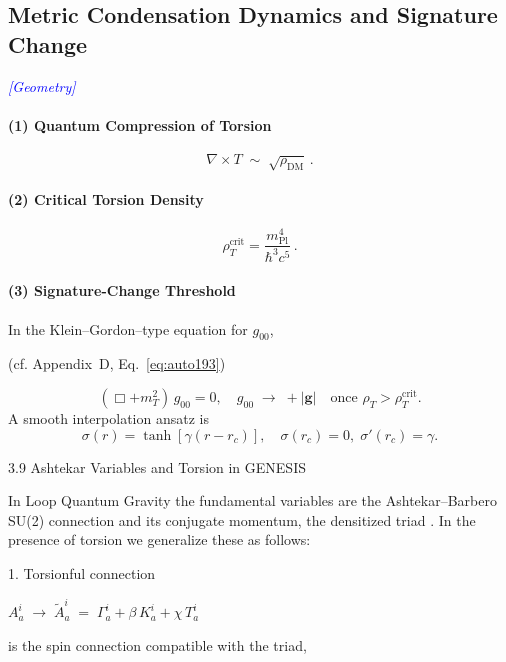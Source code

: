 \documentclass{article}
\newcommand{\geometrytag}{\textcolor{blue}{\textit{[Geometry]}}}
\begin{document}
\subsection{Metric Condensation Dynamics and Signature Change}
\label{sec:thermo_core}
\geometrytag

\paragraph{(1) Quantum Compression of Torsion}
\begin{equation}\label{eq:auto97}
\nabla\times T \;\sim\; \sqrt{\rho_{\mathrm{DM}}}\,.
\end{equation}
\paragraph{(2) Critical Torsion Density}
\begin{equation}\label{eq:auto98}
\rho_T^{\mathrm{crit}}
  = \frac{m_{\mathrm{Pl}}^4}{\hbar^3c^5}\,.
\end{equation}
\paragraph{(3) Signature-Change Threshold}
In the Klein–Gordon–type equation for $g_{00}$, 

(cf. Appendix~D, Eq.~\ref{eq:auto193})


\begin{equation}\label{eq:auto99}
(\Box + m_T^2)\,g_{00}=0,
  \quad
  g_{00}\;\to\;+|\mathbf{g}|\quad\text{once }\rho_T>\rho_T^{\mathrm{crit}}.
\end{equation}
A smooth interpolation ansatz is
\begin{equation}\label{eq:auto100}
\sigma(r)=\tanh[\gamma(r-r_c)], 
  \quad
  \sigma(r_c)=0,\;\sigma'(r_c)=\gamma.
\end{equation}


3.9 Ashtekar Variables and Torsion in GENESIS

In Loop Quantum Gravity the fundamental variables are the Ashtekar–Barbero SU(2) connection  and its conjugate momentum, the densitized triad .  In the presence of torsion we generalize these as follows:

1. Torsionful connection



$A^i_a \;\longrightarrow\; \tilde A^i_a \;=\; \Gamma^i_a + \beta\,K^i_a + \chi\,T^i_a$

 is the spin connection compatible with the triad,
\end{document}
